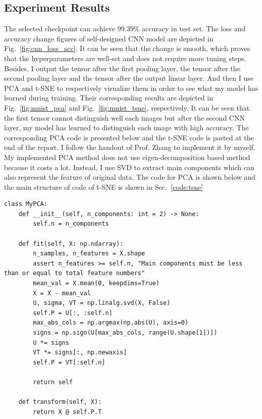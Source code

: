 \subsection{Experiment Results}
The selected checkpoint can achieve $99.39\%$ accuracy in test set. The loss and accuracy change figures of self-designed CNN model are depicted in Fig.~\ref{fig:cnn_loss_acc}. It can be seen that the change is smooth, which proves that the hyperparameters are well-set and does not require more tuning steps.
\newline
\newline
\noindent 
Besides, I output the tensor after the first pooling layer, the tensor after the second pooling layer and the tensor after the output linear layer. 
And then I use PCA and t-SNE to respectively visualize them in order to see what my model has learned during training.
Their corresponding results are depicted in Fig.~\ref{fig:mnist_pca} and Fig.~\ref{fig:mnist_tsne}, respectively.
It can be seen that the first tensor cannot distinguish well each images but after the second CNN layer, my model has learned to distinguish each image with high accuracy.
The corresponding PCA code is presented below and the t-SNE code is pasted at the end of the report. 
I follow the handout of Prof. Zhang to implement it by myself.
My implemented PCA method does not use eigen-decomposition based method because it costs a lot. 
Instead, I use SVD to extract main components which can also represent the feature of original data. 
The code for PCA is shown below and the main structure of code of t-SNE is shown in Sec.~\ref{code:tsne}
\begin{lstlisting}
class MyPCA:
    def __init__(self, n_components: int = 2) -> None:
        self.n = n_components
    
    def fit(self, X: np.ndarray):
        n_samples, n_features = X.shape
        assert n_features >= self.n, "Main components must be less than or equal to total feature numbers"
        mean_val = X.mean(0, keepdims=True)
        X = X - mean_val
        U, sigma, VT = np.linalg.svd(X, False)
        self.P = U[:, :self.n]
        max_abs_cols = np.argmax(np.abs(U), axis=0)
        signs = np.sign(U[max_abs_cols, range(U.shape[1])])
        U *= signs
        VT *= signs[:, np.newaxis]
        self.P = VT[:self.n]

        return self
    
    def transform(self, X):
        return X @ self.P.T
\end{lstlisting}